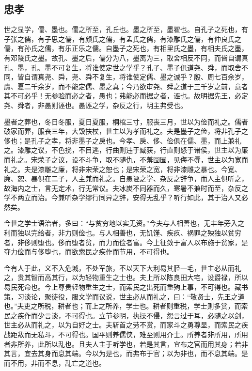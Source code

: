 \documentclass[]{article}
\begin{document}
\hypertarget{header-n1594}{%
\subsection{忠孝}\label{header-n1594}}

世之显学，儒、墨也。儒之所至，孔丘也。墨之所至，墨翟也。自孔子之死也，有子张之儒，有子思之儒，有颜氏之儒，有孟氏之儒，有漆雕氏之儒，有仲良氏之儒，有孙氏之儒，有乐正乐之儒。自墨子之死也，有相里氏之墨，有相夫氏之墨，有邓陵氏之墨。故孔、墨之后，儒分为八，墨离为三，取舍相反不同，而皆自谓真孔、墨，孔、墨不可复生，将谁使定世之学乎？孔子、墨子俱道尧、舜，而取舍不同，皆自谓真尧、舜，尧、舜不复生，将谁使定儒、墨之诚乎？殷、周七百余岁，虞、夏二千余岁，而不能定儒、墨之真；今乃欲审尧、舜之道于三千岁之前，意者其不可必乎！无参验而必之者，愚也；弗能必而据之者，诬也。故明据先王，必定尧、舜者，非愚则诬也。愚诬之学，杂反之行，明主弗受也。

墨者之葬也，冬日冬服，夏日夏服，桐棺三寸，服丧三月，世以为俭而礼之。儒者破家而葬，服丧三年，大毁扶杖，世主以为孝而礼之。夫是墨子之俭，将非孔子之侈也；是孔子之孝，将非墨子之戾也。今孝、戾、侈、俭俱在儒、墨，而上兼礼之。漆雕之议，不色挠，不目逃，行曲则违于臧获，行直则怒于诸侯，世主以为廉而礼之。宋荣子之议，设不斗争，取不随仇，不羞囹圄，见侮不辱，世主以为宽而礼之。夫是漆雕之廉，将非宋荣之恕也；是宋荣之宽，将非漆雕之暴也。今宽、廉、恕、暴俱在二子，人主兼而礼之。自愚诬之学、杂反之辞争，而人主俱听之，故海内之士，言无定术，行无常议。夫冰炭不同器而久，寒暑不兼时而至，杂反之学不两立而治。今兼听杂学缪行同异之辞，安得无乱乎？听行如此，其于治人又必然矣。

今世之学士语治者，多曰：``与贫穷地以实无资。''今夫与人相善也，无丰年旁入之利而独以完给者，非力则俭也。与人相善也，无饥馑、疾疚、祸罪之殃独以贫穷者，非侈则堕也。侈而堕者贫，而力而俭者富。今上征敛于富人以布施于贫家，是夺力俭而与侈堕也，而欲索民之疾作而节用，不可得也。

今有人于此，义不入危城，不处军旅，不以天下大利易其胫一毛，世主必从而礼之，贵其智而高其行，以为轻物重生之士也。夫上所以陈良田大宅，设爵禄，所以易民死命也。今上尊贵轻物重生之士，而索民之出死而重殉上事，不可得也。藏书策，习谈论，聚徒役，服文学而议说，世主必从而礼之，曰：``敬贤士，先王之道也。''夫吏之所税，耕者也；而上之所养，学士也。耕者则重税，学士则多赏，而索民之疾作而少言谈，不可得也。立节参明，执操不侵，怨言过于耳，必随之以剑，世主必从而礼之，以为自好之士。夫斩首之劳不赏，而家斗之勇尊显，而索民之疾战距敌而无私斗，不可得也。国平则养儒侠，难至则用介士。所养者非所用，所用者非所养，此所以乱也。且夫人主于听学也，若是其言，宜布之官而用其身；若非其言，宜去其身而息其端。今以为是也，而弗布于官；以为非也，而不息其端。是而不用，非而不息，乱亡之道也。
\end{document}
